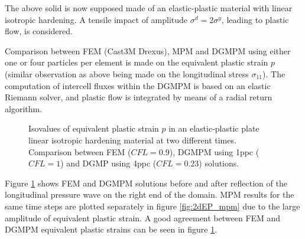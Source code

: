 The above solid is now supposed made of an elastic-plastic material with linear isotropic hardening. A tensile impact of amplitude $\sigma^d=2\sigma^y$, leading to plastic flow, is considered. 

Comparison between FEM (Cast3M Drexus), MPM and DGMPM using either one or four particles per element is made on the equivalent plastic strain $p$ (similar observation as above being made on the longitudinal stress $\sigma_{11}$).
The computation of intercell fluxes within the DGMPM is based on an elastic Riemann solver, and plastic flow is integrated by means of a radial return algorithm.
\begin{figure}[h!]
  \centering
  
  \caption{Isovalues of equivalent plastic strain $p$ in an elastic-plastic plate linear isotropic hardening material at two different times. Comparison between FEM ($CFL=0.9$), DGMPM using 1ppc ($CFL=1$) and DGMP using 4ppc ($CFL=0.23$) solutions.}
  \label{fig:2dEP_comparison}
\end{figure}
Figure \ref{fig:2dEP_comparison} shows FEM and DGMPM solutions before and after reflection of the longitudinal pressure wave on the right end of the domain. MPM results for the same time steps are plotted separately in figure \ref{fig:2dEP_mpm} due to the large amplitude of equivalent plastic strain. A good agreement between FEM and DGMPM equivalent plastic strains can be seen in figure \ref{fig:2dEP_comparison}. 

